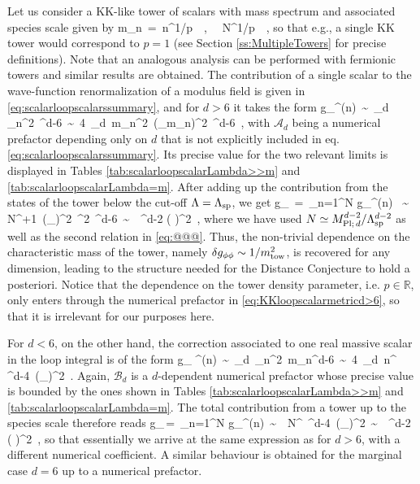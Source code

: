 Let us consider a KK-like tower of scalars with mass spectrum and associated species scale given by
%
\beq\label{eq:@@@}
	m_n\, =\, n^{1/p}\, \Mt \, , \qquad   \LSP\,  \simeq\, N^{1/p}\, \Mt \, ,
\eeq
%
so that e.g., a single KK tower would correspond to $p=1$ (see Section \ref{ss:MultipleTowers} for precise definitions). Note that an analogous analysis can be performed with fermionic towers and similar results are obtained. The  contribution of a single scalar to the wave-function renormalization of a modulus field is given in \eqref{eq:scalarloopscalarssummary}, and for $d>6$ it takes the form
%
\beq
	\delta g_{\phi\phi}^{(n)}\, \sim\,  _d\, \lambda_n^{2}\, \Lambda^{d-6}\, \sim\, 4\, _d\, m_n^2\, (\partial_\phi m_n)^2\, \Lambda^{d-6}\, ,
\eeq
%
with $\mathcal{A}_d$ being a numerical prefactor depending only on $d$ that is not explicitly included in eq. \eqref{eq:scalarloopscalarssummary}. Its precise value for the two relevant limits is displayed in Tables \ref{tab:scalarloopscalarLambda>>m} and \ref{tab:scalarloopscalarLambda=m}. After adding up the contribution from the states of the tower below the cut-off $\Lambda = \Lambda_{\text{sp}} $, we get
%
\beq \label{eq:KKloopscalarmetricd>6}
	\delta g_{\phi\phi} \,=\, \sum_{n=1}^{N} \delta g_{\phi \phi}^{(n)}  \, \sim\, \,  N^{+1}\,  (\partial_\phi \Mt)^2\, \Mt^2\, \LSP^{d-6}\, \sim\, \, \Mpd^{d-2} \left( \frac{\partial_\phi \Mt}{\Mt}\right)^2\, ,
\eeq
%
where we have used $N \simeq M_{\text{Pl;}\, d}^{d-2}/ \Lambda_{\text{sp}}^{d-2}$ as well as the second relation in \eqref{eq:@@@}. Thus, the non-trivial dependence on the characteristic mass of the tower, namely $\delta g_{\phi\phi} \sim 1/m_{\text{tow}}^2$, is recovered for any dimension, leading to the structure needed for the Distance Conjecture to hold a posteriori. Notice that the dependence on the tower density parameter, i.e. $p \in \mathbb{R}$, only enters through the numerical prefactor in \eqref{eq:KKloopscalarmetricd>6}, so that it is irrelevant for our purposes here.

For $d<6$, on the other hand, the correction associated to one real massive scalar in the loop integral is of the form
%
\beq
	\delta 
	g_{\phi\phi} ^{(n)}\, \sim\, _d\, \lambda_n^2\,  m_n^{d-6}\, \sim\, 4\, _d\, n^{}\, \Mt^{d-4}\, (\partial_\phi \Mt)^2\, .
\eeq
%
Again, $\mathcal{B}_d$ is a $d$-dependent numerical prefactor whose precise value is bounded by the ones shown in Tables \ref{tab:scalarloopscalarLambda>>m} and  \ref{tab:scalarloopscalarLambda=m}. The total contribution from a tower up to the species scale therefore reads
%
\beq 
	\delta g_{\phi\phi}\,=\, \sum_{n=1}^{N} \delta g_{\phi \phi}^{(n)}\, \sim\, \, N^{}\, \Mt^{d-4}\, (\partial_\phi \Mt)^2\, \sim\, \, \Mpd^{d-2} \left( \frac{\partial_\phi \Mt}{\Mt}\right)^2\, ,
\eeq
%
so that essentially we arrive at the same expression as for $d>6$, with a different numerical coefficient. A similar behaviour is obtained for the marginal case $d=6$ up to a numerical prefactor.
	
